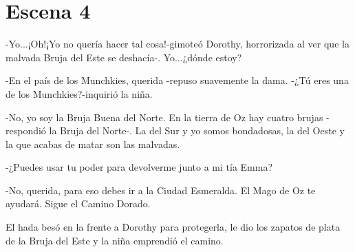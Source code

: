 \chapter{Escena 4}
-Yo...¡Oh!¡Yo no quería hacer tal cosa!-gimoteó Dorothy, horrorizada al ver que la malvada Bruja del Este se deshacía-. Yo...¿dónde estoy?

-En el país de los Munchkies, querida -repuso suavemente la dama.
-¿Tú eres una de los Munchkies?-inquirió la niña.

-No, yo soy la Bruja Buena del Norte. En la tierra de Oz hay cuatro brujas -respondió la Bruja del Norte-. La del Sur y yo somos bondadosas, la del Oeste y la que acabas de matar son las malvadas. 

-¿Puedes usar tu poder para devolverme junto a mi tía Emma?

-No, querida, para eso debes ir a la Ciudad Esmeralda. El Mago de Oz te ayudará. Sigue el Camino Dorado.

El hada besó en la frente a Dorothy para protegerla, le dio los zapatos de plata de la Bruja del Este y la niña emprendió el camino.